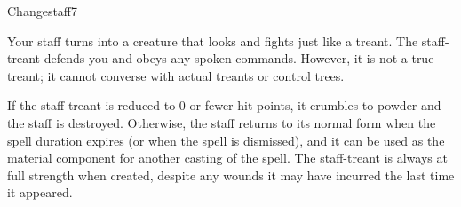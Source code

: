 \begin{spellsection}{Changestaff}{7}
\begin{spellheader}
\end{spellheader}
\begin{spellcontent}
    \begin{spelltargetinginfo}
    \end{spelltargetinginfo}
    \begin{spelleffects}
        \spelleffect Your staff turns into a creature that looks and fights just like a treant. The staff-treant defends you and obeys any spoken commands. However, it is not a true treant; it cannot converse with actual treants or control trees.

        If the staff-treant is reduced to 0 or fewer hit points, it crumbles to powder and the staff is destroyed. Otherwise, the staff returns to its normal form when the spell duration expires (or when the spell is dismissed), and it can be used as the material component for another casting of the spell. The staff-treant is always at full strength when created, despite any wounds it may have incurred the last time it appeared.
        \spelldur \durmed \dismissable
    \end{spelleffects}
\end{spellcontent}
\begin{spellfooter}
\end{spellfooter}
\end{spellsection}

